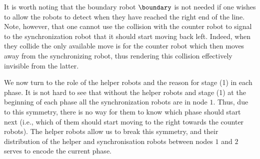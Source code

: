 It is worth noting that the boundary robot $\boundary$ is not needed if one
wishes to allow the robots to detect when they have reached the right end of the
line. Note, however, that one cannot use the collision with the counter robot to
signal to the synchronization robot that it should start moving back left.
Indeed, when they collide the only available move is for the counter robot which
then moves away from the synchronizing robot, thus rendering this collision
effectively invisible from the latter.

We now turn to the role of the helper robots and the reason for stage (1) in
each phase. It is not hard to see that without the helper robots and stage (1)
at the beginning of each phase all the synchronization robots are in node $1$.
Thus, due to this symmetry, there is no way for them to know which phase should
start next (i.e., which of them should start moving to the right towards the counter robots). 
The helper robots allow us to break this symmetry, and their
distribution of the helper and synchronisation robots between nodes $1$ and $2$ serves to encode the current phase.

